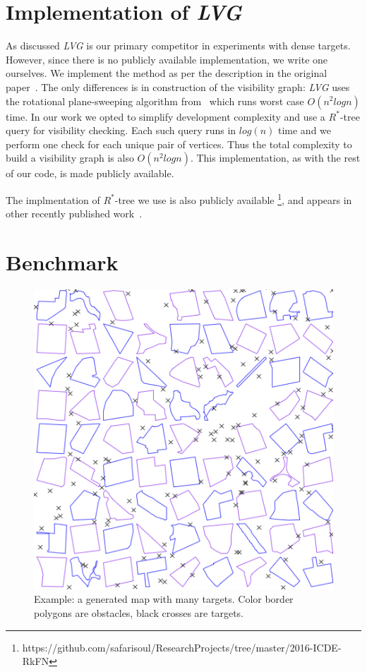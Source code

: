\section{Implementation of \textit{LVG}}\label{imptlvg}
As discussed \textit{LVG} is our primary competitor in experiments with dense targets.
However, since there is no publicly available implementation, we write one ourselves.
We implement the method as per the description in the original paper~\cite{zhang2004spatial}.
The only differences is in construction of the visibility graph:
\textit{LVG} uses the rotational plane-sweeping algorithm from~\cite{sharir1986shortest} which runs worst case $O(n^2logn)$ time.
In our work we opted to simplify development complexity and use a $R^*$-tree\cite{beckmann1990r} query for visibility checking.
Each such query runs in $log(n)$ time  and we perform one check for each unique pair of vertices.
Thus the total complexity to build a visibility graph is also $O(n^2logn)$.
This implementation, as with the rest of our code, is made publicly available.

The implmentation of $R^*$-tree we use is also publicly available \footnote{https://github.com/safarisoul/ResearchProjects/tree/master/2016-ICDE-RkFN},
and appears in other recently published work~\cite{wang2016efficiently}.

\section{Benchmark}\label{dataset}

\begin{figure}[!hbt]
  \centering
  \includegraphics[width=.7\linewidth]{pic/distribution.png}
  \caption{\small Example: a generated map with many targets. Color border polygons are
  obstacles, black crosses are targets.}\label{distribution}
\end{figure}

